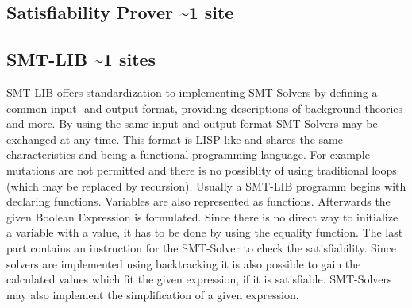 \subsection{Satisfiability Prover \textasciitilde 1 site}
\subsection{SMT-LIB \textasciitilde 1 sites}
SMT-LIB offers standardization to implementing SMT-Solvers by defining a common input- and output format, providing descriptions of background theories and more. %
By using the same input and output format SMT-Solvers may be exchanged at any time. 
This format is LISP-like and shares the same characteristics and being a functional programming language. 
For example mutations are not permitted and there is no possiblity of using traditional loops (which may be replaced by recursion).
Usually a SMT-LIB programm begins with declaring functions. Variables are also represented as functions. 
Afterwards the given Boolean Expression is formulated. Since there is no direct way to initialize a variable with a value, it has to be done by using the equality function. 
The last part contains an instruction for the SMT-Solver to check the satisfiability. 
Since solvers are implemented using backtracking it is also possible to gain the calculated values which fit the given expression, if it is satisfiable. 
SMT-Solvers may also implement the simplification of a given expression.